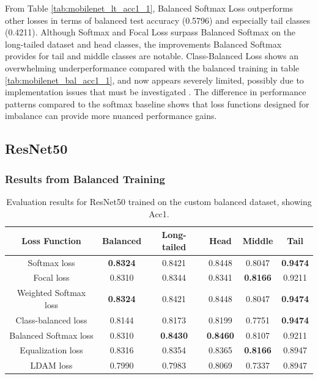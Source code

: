 From Table \ref{tab:mobilenet_lt_acc1_1}, Balanced Softmax Loss outperforms other losses in terms of balanced test accuracy (0.5796) and especially tail classes (0.4211). Although Softmax and Focal Loss surpass Balanced Softmax on the long-tailed dataset and head classes, the improvements Balanced Softmax provides for tail and middle classes are notable. Class-Balanced Loss shows an overwhelming underperformance compared with the balanced training in table \ref{tab:mobilenet_bal_acc1_1}, and now appears severely limited, possibly due to implementation issues that must be investigated . The difference in performance patterns compared to the softmax baseline shows that loss functions designed for imbalance can provide more nuanced performance gains.

\subsection{ResNet50}

\subsubsection{Results from Balanced Training}

\begin{table}[H]
    \centering
    \caption{Evaluation results for ResNet50 trained on the custom balanced dataset, showing Acc1.}
    \begin{tabular}{cccccc}
        \toprule
        Loss Function & Balanced & Long-tailed & Head & Middle & Tail \\ 
        \midrule
        Softmax loss   & \textbf{0.8324}  & 0.8421 & 0.8448 & 0.8047 & \textbf{0.9474} \\
        Focal loss   & 0.8310  & 0.8344 & 0.8341 & \textbf{0.8166} & 0.9211 \\
        Weighted Softmax loss   & \textbf{0.8324} & 0.8421 & 0.8448 & 0.8047 & \textbf{0.9474} \\
        Class-balanced loss   &  0.8144 & 0.8173 & 0.8199 & 0.7751 & \textbf{0.9474} \\
        Balanced Softmax loss   & 0.8310 & \textbf{0.8430} & \textbf{0.8460} & 0.8107 & 0.9211 \\
        Equalization loss   & 0.8316 & 0.8354 & 0.8365 & \textbf{0.8166} & 0.8947 \\
        LDAM loss   & 0.7990 & 0.7983 & 0.8069 & 0.7337 & 0.8947 \\
        \bottomrule
    \end{tabular}
    \label{tab:resnet_bal_acc1_1}
\end{table}

